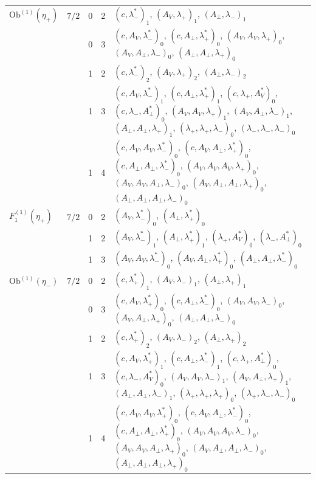 \documentclass[11pt]{article}
\numberwithin{equation}{section}
\theoremstyle{plain}
\theoremstyle{definition}
\newcommand{\Ob}{\mathrm{Ob}}
\begin{document}
{\begin{longtable}{>{\raggedright}p{2.3cm}|p{0.6cm}|p{0.25cm}|p{0.25cm}|>{\raggedright\arraybackslash}p{11.6cm}}
\hline
$\Ob^{(1)}(\eta_+)$ & $7/2$ & 0 & 2 & $(c,\lambda^*_-)_{1}$, $(A_V,\lambda_+)_{1}$, $(A_\perp,\lambda_-)_{1}$ \\
 &  & 0 & 3 & $(c,A_V,\lambda^*_-)_{0}$, $(c,A_\perp,\lambda^*_+)_{0}$, $(A_V,A_V,\lambda_+)_{0}$, $(A_V,A_\perp,\lambda_-)_{0}$, $(A_\perp,A_\perp,\lambda_+)_{0}$ \\
 &  & 1 & 2 & $(c,\lambda^*_-)_{2}$, $(A_V,\lambda_+)_{2}$, $(A_\perp,\lambda_-)_{2}$ \\
 &  & 1 & 3 & $(c,A_V,\lambda^*_-)_{1}$, $(c,A_\perp,\lambda^*_+)_{1}$, $(c,\lambda_+,A^*_V)_{0}$, $(c,\lambda_-,A^*_\perp)_{0}$, $(A_V,A_V,\lambda_+)_{1}$, $(A_V,A_\perp,\lambda_-)_{1}$, $(A_\perp,A_\perp,\lambda_+)_{1}$, $(\lambda_+,\lambda_+,\lambda_-)_{0}$, $(\lambda_-,\lambda_-,\lambda_-)_{0}$ \\
 &  & 1 & 4 & $(c,A_V,A_V,\lambda^*_-)_{0}$, $(c,A_V,A_\perp,\lambda^*_+)_{0}$, $(c,A_\perp,A_\perp,\lambda^*_-)_{0}$, $(A_V,A_V,A_V,\lambda_+)_{0}$, $(A_V,A_V,A_\perp,\lambda_-)_{0}$, $(A_V,A_\perp,A_\perp,\lambda_+)_{0}$, $(A_\perp,A_\perp,A_\perp,\lambda_-)_{0}$ \\
\hline
$F_1^{(1)}(\eta_+)$ & $7/2$ & 0 & 2 & $(A_V,\lambda^*_-)_{0}$, $(A_\perp,\lambda^*_+)_{0}$ \\
 &  & 1 & 2 & $(A_V,\lambda^*_-)_{1}$, $(A_\perp,\lambda^*_+)_{1}$, $(\lambda_+,A^*_V)_{0}$, $(\lambda_-,A^*_\perp)_{0}$ \\
 &  & 1 & 3 & $(A_V,A_V,\lambda^*_-)_{0}$, $(A_V,A_\perp,\lambda^*_+)_{0}$, $(A_\perp,A_\perp,\lambda^*_-)_{0}$ \\
\hline
$\Ob^{(1)}(\eta_-)$ & $7/2$ & 0 & 2 & $(c,\lambda^*_+)_{1}$, $(A_V,\lambda_-)_{1}$, $(A_\perp,\lambda_+)_{1}$ \\
 &  & 0 & 3 & $(c,A_V,\lambda^*_+)_{0}$, $(c,A_\perp,\lambda^*_-)_{0}$, $(A_V,A_V,\lambda_-)_{0}$, $(A_V,A_\perp,\lambda_+)_{0}$, $(A_\perp,A_\perp,\lambda_-)_{0}$ \\
 &  & 1 & 2 & $(c,\lambda^*_+)_{2}$, $(A_V,\lambda_-)_{2}$, $(A_\perp,\lambda_+)_{2}$ \\
 &  & 1 & 3 & $(c,A_V,\lambda^*_+)_{1}$, $(c,A_\perp,\lambda^*_-)_{1}$, $(c,\lambda_+,A^*_\perp)_{0}$, $(c,\lambda_-,A^*_V)_{0}$, $(A_V,A_V,\lambda_-)_{1}$, $(A_V,A_\perp,\lambda_+)_{1}$, $(A_\perp,A_\perp,\lambda_-)_{1}$, $(\lambda_+,\lambda_+,\lambda_+)_{0}$, $(\lambda_+,\lambda_-,\lambda_-)_{0}$ \\
 &  & 1 & 4 & $(c,A_V,A_V,\lambda^*_+)_{0}$, $(c,A_V,A_\perp,\lambda^*_-)_{0}$, $(c,A_\perp,A_\perp,\lambda^*_+)_{0}$, $(A_V,A_V,A_V,\lambda_-)_{0}$, $(A_V,A_V,A_\perp,\lambda_+)_{0}$, $(A_V,A_\perp,A_\perp,\lambda_-)_{0}$, $(A_\perp,A_\perp,A_\perp,\lambda_+)_{0}$ \\

\end{longtable}}
\end{document}
